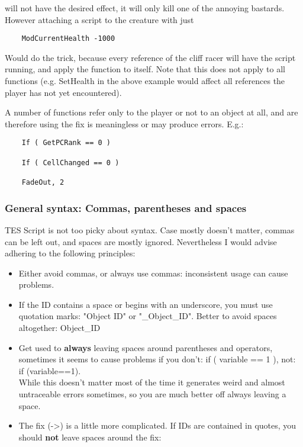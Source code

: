 will not have the desired effect, it will only kill one of the annoying
bastards. However attaching a script to the creature with just

\begin{lstlisting}
	ModCurrentHealth -1000
\end{lstlisting}

Would do the trick, because every reference of the cliff racer will have
the script running, and apply the function to itself. Note that this
does not apply to all functions (e.g. SetHealth in the above example
would affect all references the player has not yet encountered).

A number of functions refer only to the player or not to an object at
all, and are therefore using the fix is meaningless or may produce
errors. E.g.:

\begin{lstlisting}
	If ( GetPCRank == 0 )
	
	If ( CellChanged == 0 )
	
	FadeOut, 2
\end{lstlisting}

\hypertarget{general-syntax-commas-parentheses-and-spaces}{%
\subsubsection{General syntax: Commas, parentheses and
spaces}\label{general-syntax-commas-parentheses-and-spaces}}

TES Script is not too picky about syntax. Case mostly doesn't matter,
commas can be left out, and spaces are mostly ignored. Nevertheless I
would advise adhering to the following principles:

\begin{itemize}
\item
  Either avoid commas, or always use commas: inconsistent usage can
  cause problems.
\item
  If the ID contains a space or begins with an underscore, you must use
  quotation marks: "Object ID" or "\_Object\_ID". Better to avoid spaces
  altogether: Object\_ID
\item
  Get used to \textbf{always} leaving spaces around parentheses and
  operators, sometimes it seems to cause problems if you don't: if (
  variable == 1 ), not: if (variable==1).\\
  While this doesn't matter most of the time it generates weird and
  almost untraceable errors sometimes, so you are much better off always
  leaving a space.
\item
  The fix (->) is a little more complicated. If IDs are
  contained in quotes, you should \textbf{not} leave spaces around the
  fix:
\end{itemize}

